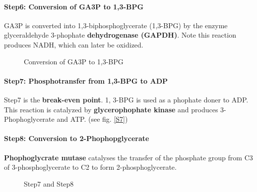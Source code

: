 \documentclass[../main.tex]{subfiles}
\begin{document}
\paragraph{Step6: Conversion of GA3P to 1,3-BPG}
GA3P is converted into 1,3-biphosphoglycerate (1,3-BPG) by the enzyme glyceraldehyde 3-phophate \textbf{dehydrogenase (GAPDH)}. Note this reaction produces NADH, which can later be oxidized.  
\begin{figure}[H]
	\centering
	\caption{Conversion of GA3P to 1,3-BPG}
\end{figure}

\paragraph{Step7: Phosphotransfer from 1,3-BPG to ADP}
Step7 is the \textbf{break-even point}. 1, 3-BPG is used as a phophate doner to ADP. This reaction is catalyzed by \textbf{glycerophophate kinase} and produces 3-Phophoglycerate and ATP. (see fig. \ref{S7})

\paragraph{Step8: Conversion to 2-Phophopglycerate}
\textbf{Phophoglycrate mutase} catalyses the transfer of the phosphate group from C3 of 3-phosphoglycerate to C2 to form 2-phosphoglycerate. 

\begin{figure}[h!]
	\centering
	\caption{Step7 and Step8}
\end{figure}
\end{document}

